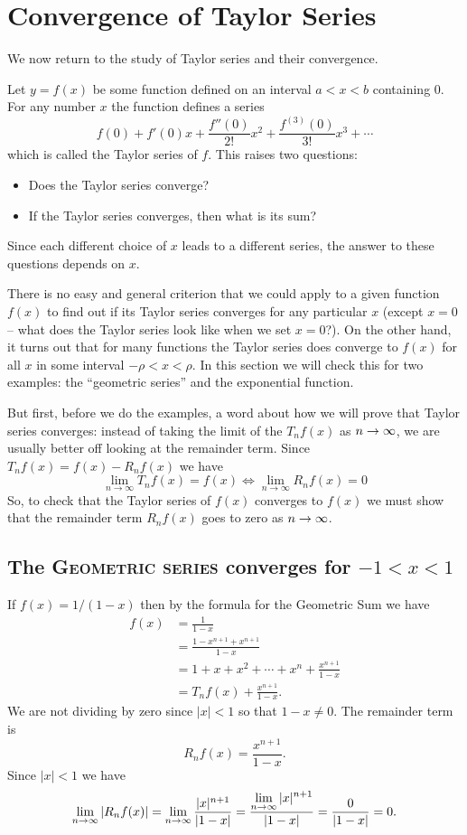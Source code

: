 \section{Convergence of Taylor Series} %
\label{sec:conv-tayl-seri}
We now return to the study of Taylor series and their convergence.

Let $y=f(x)$ be some function defined on an interval $a<x<b$ containing $0$.
For any number $x$ the function defines a series
\begin{equation}
  f(0) + f'(0)x + \frac{f''(0)}{2!}x^2 + \frac{f^{(3)}(0)}{3!} x^3 + \cdots
\end{equation}
which is called the Taylor series of $f$.  This raises two questions:
\begin{itemize}
\item Does the Taylor series converge?
\item If the Taylor series converges, then what is its sum?
\end{itemize}
Since each different choice of $x$ leads to a different series, the answer to
these questions depends on $x$.

There is no easy and general criterion that we could apply to a given function
$f(x)$ to find out if its Taylor series converges for any particular $x$
(except $x=0$ -- what does the Taylor series look like when we set $x=0$?).  On
the other hand, it turns out that for many functions the Taylor series does
converge to $f(x)$ for all $x$ in some interval $-\rho<x<\rho$.  In this section
we will check this for two examples: the ``geometric series'' and the
exponential function.

But first, before we do the examples, a word about how we will prove that Taylor
series converges: instead of taking the limit of the $T_nf(x)$ as $n\to\infty$, we
are usually better off looking at the remainder term.  Since $T_nf(x) =
f(x)-R_nf(x)$ we have
\[
\lim_{n\to\infty} T_nf(x) =f(x) \iff \lim_{n\to\infty} R_nf(x) = 0
\]
So, to check that the Taylor series of $f(x)$ converges to $f(x)$ we must
show that the remainder term $R_nf(x)$ goes to zero as $n\to\infty$.

\subsection{The \textsc{Geometric series} converges for $-1<x<1$} %
If $f(x)=1/(1-x)$ then by the formula for the Geometric Sum we have
\begin{align*}
  f(x) &= \frac1{1-x} \\
  &=\frac{1-x^{n+1}+x^{n+1}}{1-x}\\
  &=1+x+x^2+\cdots+x^n+\frac{x^{n+1}}{1-x} \\
  &=T_nf(x)+\frac{x^{n+1}}{1-x}.
\end{align*}
We are not dividing by zero since $|x|<1$ so that $1-x\neq0$. The remainder
term is
\[
R_nf(x) = \frac{x^{n+1}}{1-x}.
\]
Since $|x|<1$ we have
\[
\lim_{n\to\infty} |R_nf(x)|=\lim_{n\to\infty} \frac{|x|^{n+1}}{|1-x|}
=\frac{\displaystyle\lim_{n\to\infty}|x|^{n+1}}{|1-x|} =\frac0{|1-x|} =0.
\]

